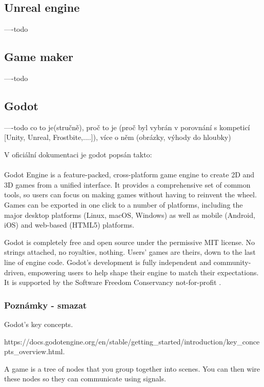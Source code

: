 \subsection{Unreal engine}
----todo \linebreak

\subsection{Game maker}
----todo \linebreak


\subsection{Godot}
----todo \linebreak
co to je(stručně), proč to je (proč byl vybrán  v porovnání s kompeticí [Unity, Unreal, Frostbite,....]), více o  něm (obrázky, výhody do hloubky)

V oficiální dokumentaci je godot popsán takto:

\paragraph{}
Godot Engine is a feature-packed, cross-platform game engine to create 2D and 3D games from a unified interface. It provides a comprehensive set of common tools, so users can focus on making games without having to reinvent the wheel. Games can be exported in one click to a number of platforms, including the major desktop platforms (Linux, macOS, Windows) as well as mobile (Android, iOS) and web-based (HTML5) platforms.

Godot is completely free and open source under the permissive MIT license. No strings attached, no royalties, nothing. Users' games are theirs, down to the last line of engine code. Godot's development is fully independent and community-driven, empowering users to help shape their engine to match their expectations. It is supported by the Software Freedom Conservancy not-for-profit \cite{godot_introduction} .

\subsubsection{Poznámky - smazat}
Godot's key concepts.

https://docs.godotengine.org/en/stable/getting\_started/introduction/key\_concepts\_overview.html.

A game is a tree of nodes that you group together into scenes. You can then wire these nodes so they can communicate using signals.

